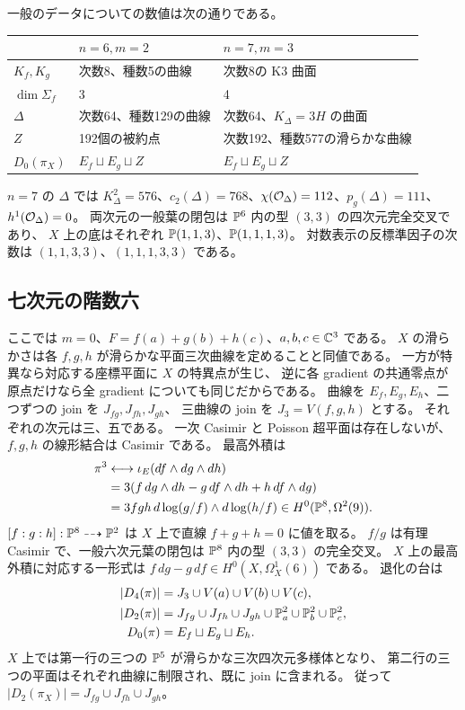 一般のデータについての数値は次の通りである。
\begin{center}
\begin{tabular}{lll}\toprule
 & $n=6,m=2$ & $n=7,m=3$\\\midrule
$K_f,K_g$ & 次数8、種数5の曲線 & 次数8の K3 曲面\\
$\dim\Sigma_f$ & 3 & 4\\
$\Delta$ & 次数64、種数129の曲線 & 次数64、$K_\Delta=3H$ の曲面\\
$Z$ & 192個の被約点 & 次数192、種数577の滑らかな曲線\\
$D_0(\pi_X)$ & $E_f\sqcup E_g\sqcup Z$ & $E_f\sqcup E_g\sqcup Z$\\\bottomrule
\end{tabular}
\end{center}
$n=7$ の $\Delta$ では
$K_\Delta^2=576$、$c_2(\Delta)=768$、$\chi(\mathcal O_\Delta)=112$、$p_g(\Delta)=111$、$h^1(\mathcal O_\Delta)=0$。
両次元の一般葉の閉包は $\mathbb P^6$ 内の型 $(3,3)$ の四次元完全交叉であり、
$X$ 上の底はそれぞれ $\mathbb P(1,1,3)$、$\mathbb P(1,1,1,3)$。
対数表示の反標準因子の次数は $(1,1,3,3)$、$(1,1,1,3,3)$ である。

\subsection{七次元の階数六}
ここでは $m=0$、$F=f(a)+g(b)+h(c)$、$a,b,c\in\mathbb C^3$ である。
$X$ の滑らかさは各 $f,g,h$ が滑らかな平面三次曲線を定めることと同値である。
一方が特異なら対応する座標平面に $X$ の特異点が生じ、
逆に各 gradient の共通零点が原点だけなら全 gradient についても同じだからである。
曲線を $E_f,E_g,E_h$、二つずつの join を $J_{fg},J_{fh},J_{gh}$、
三曲線の join を $J_3=V(f,g,h)$ とする。
それぞれの次元は三、五である。
一次 Casimir と Poisson 超平面は存在しないが、$f,g,h$ の線形結合は Casimir である。
最高外積は
\begin{equation}\begin{aligned}
\pi^3&\longleftrightarrow\iota_E(df\wedge dg\wedge dh)\\
&=3(f\,dg\wedge dh-g\,df\wedge dh+h\,df\wedge dg)\\
&=3fgh\,d\log(g/f)\wedge d\log(h/f)\in H^0(\mathbb P^8,\Omega^2(9)).
\end{aligned}\end{equation}
$[f:g:h]:\mathbb P^8\dashrightarrow\mathbb P^2$ は $X$ 上で直線 $f+g+h=0$ に値を取る。
$f/g$ は有理 Casimir で、一般六次元葉の閉包は $\mathbb P^8$ 内の型 $(3,3)$ の完全交叉。
$X$ 上の最高外積に対応する一形式は
$f\,dg-g\,df\in H^0(X,\Omega_X^1(6))$ である。
退化の台は
\begin{equation}\begin{aligned}
|D_4(\pi)|&=J_3\cup V(a)\cup V(b)\cup V(c),\\
|D_2(\pi)|&=J_{fg}\cup J_{fh}\cup J_{gh}\cup\mathbb P_a^2\cup\mathbb P_b^2\cup\mathbb P_c^2,\\
D_0(\pi)&=E_f\sqcup E_g\sqcup E_h.
\end{aligned}\end{equation}
$X$ 上では第一行の三つの $\mathbb P^5$ が滑らかな三次四次元多様体となり、
第二行の三つの平面はそれぞれ曲線に制限され、既に join に含まれる。
従って $|D_2(\pi_X)|=J_{fg}\cup J_{fh}\cup J_{gh}$。

